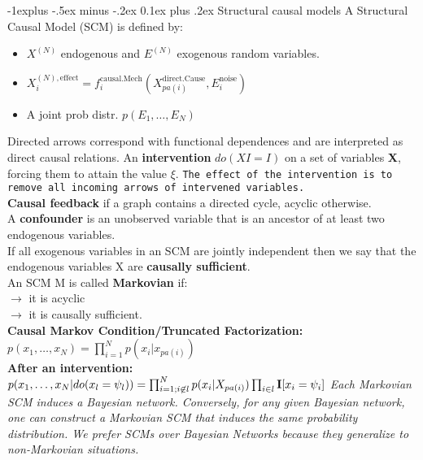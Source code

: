 \documentclass[9pt,landscape]{article}
\makeatletter
\renewcommand{\subsection}{\@startsection{subsection}{2}{0mm}%
                                {-1explus -.5ex minus -.2ex}%
                                {0.1ex plus .2ex}%
                                {\normalfont\scriptsize\bfseries}}
\makeatother
\begin{document}
\begin{multicols}{3}
\subsection{Structural causal models}
A Structural Causal Model (SCM) is defined by:
\begin{itemize}
\item $X^{(N)}$ endogenous and $E^{(N)}$ exogenous random variables.
\item $X_i^{(N), \text{effect}} = f^\text{causal.Mech}_i(X^\text{direct.Cause}_{pa(i)}, E_i^\text{noise})$
\item A joint prob distr. $p(E_1,\ldots, E_N)$
\end{itemize}
Directed arrows correspond with
functional dependences and are interpreted as direct causal relations. An \textbf{intervention} $do(XI = I)$ on a set of variables \textbf{X}, forcing them to attain the value $\xi$. \texttt{The effect of the intervention is to remove all incoming arrows of intervened variables.}\\
\textbf{Causal feedback} if a graph contains a directed cycle, acyclic otherwise.\\
A \textbf{confounder} is an unobserved variable that is an ancestor of at least two
endogenous variables.\\
If all exogenous variables in an SCM are jointly independent then we say that the endogenous variables X are \textbf{causally sufficient}.\\
An SCM M is called \textbf{Markovian} if:\\
$\rightarrow$ it is acyclic\\
$\rightarrow$ it is causally sufficient.\\
\textbf{Causal Markov Condition/Truncated Factorization:}\\
$p(x_1, \ldots, x_N) = \prod_{i=1}^N p(x_i|x_{pa(i)})$\\
\textbf{After an intervention:}\\
$p(x_1, \ldots, x_N|do(x_l=\psi_l)) = \prod_{i=1\\;i\not\in l}^N p(x_i|X_{pa(i)}) \prod_{i\in l} \mathbf{I}[x_i = \psi_i]$
\textit{Each Markovian SCM induces a Bayesian network. Conversely, for any given Bayesian network, one can construct a
Markovian SCM that induces the same probability distribution.
We prefer SCMs over Bayesian Networks because they generalize to
non-Markovian situations.}

\end{multicols}
\end{document}
